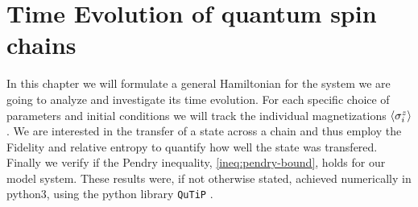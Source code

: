 \documentclass{book}
\numberwithin{equation}{section} %
\begin{document}
\chapter{Time Evolution of quantum spin chains}
In this chapter we will formulate a general Hamiltonian for the system we are going to analyze and investigate its time evolution.
For each specific choice of parameters and initial conditions we will track the individual magnetizations $\expval{\sigma^z_i}$.
We are interested in the transfer of a state across a chain and thus employ
the Fidelity and relative entropy to quantify how well the state was transfered.
Finally we verify if the Pendry inequality, \cref{ineq:pendry-bound}, holds for our model system.
These results were, if not otherwise stated, achieved numerically in python3, using the python library \texttt{QuTiP} \cite{BA_JOHANSSON20131234}.
\newpage
\end{document}
